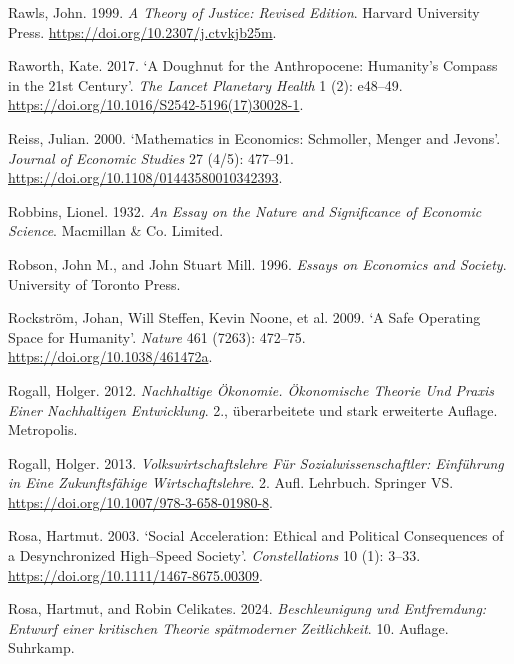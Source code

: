 \documentclass[
  british,
  a4paper,
  DIV=11,
  numbers=noendperiod,
  oneside,
  openany]{scrreprt}
\newlength{\cslhangindent}
\newenvironment{CSLReferences}[2] %
 {\begin{list}{}{%
  \setlength{\itemindent}{0pt}
  \setlength{\leftmargin}{0pt}
  \setlength{\parsep}{0pt}
  \ifodd #1
   \setlength{\leftmargin}{\cslhangindent}
   \setlength{\itemindent}{-1\cslhangindent}
  \fi
  \setlength{\itemsep}{#2\baselineskip}}}
 {\end{list}}
\begin{document}
\begin{CSLReferences}{1}{1}
Rawls, John. 1999. \emph{A {Theory} of {Justice}: {Revised} {Edition}}.
Harvard University Press. \url{https://doi.org/10.2307/j.ctvkjb25m}.

Raworth, Kate. 2017. {`A Doughnut for the Anthropocene: Humanity's
Compass in the 21st Century'}. \emph{The Lancet Planetary Health} 1 (2):
e48--49. \url{https://doi.org/10.1016/S2542-5196(17)30028-1}.

Reiss, Julian. 2000. {`Mathematics in Economics: Schmoller, Menger and
Jevons'}. \emph{Journal of Economic Studies} 27 (4/5): 477--91.
\url{https://doi.org/10.1108/01443580010342393}.

Robbins, Lionel. 1932. \emph{An Essay on the Nature and Significance of
Economic Science}. Macmillan \& Co. Limited.

Robson, John M., and John Stuart Mill. 1996. \emph{Essays on Economics
and Society}. University of Toronto Press.

Rockström, Johan, Will Steffen, Kevin Noone, et al. 2009. {`A Safe
Operating Space for Humanity'}. \emph{Nature} 461 (7263): 472--75.
\url{https://doi.org/10.1038/461472a}.

Rogall, Holger. 2012. \emph{Nachhaltige Ökonomie. Ökonomische Theorie
Und Praxis Einer Nachhaltigen Entwicklung}. 2., überarbeitete und stark
erweiterte Auflage. Metropolis.

Rogall, Holger. 2013. \emph{Volkswirtschaftslehre Für
{Sozialwissenschaftler}: {Einführung} in Eine Zukunftsfähige
{Wirtschaftslehre}}. 2. Aufl. Lehrbuch. Springer VS.
\url{https://doi.org/10.1007/978-3-658-01980-8}.

Rosa, Hartmut. 2003. {`Social Acceleration: Ethical and Political
Consequences of a Desynchronized High--Speed Society'}.
\emph{Constellations} 10 (1): 3--33.
\url{https://doi.org/10.1111/1467-8675.00309}.

Rosa, Hartmut, and Robin Celikates. 2024. \emph{Beschleunigung und
Entfremdung: Entwurf einer kritischen Theorie spätmoderner
Zeitlichkeit}. 10. Auflage. Suhrkamp.


\end{CSLReferences}
\end{document}
